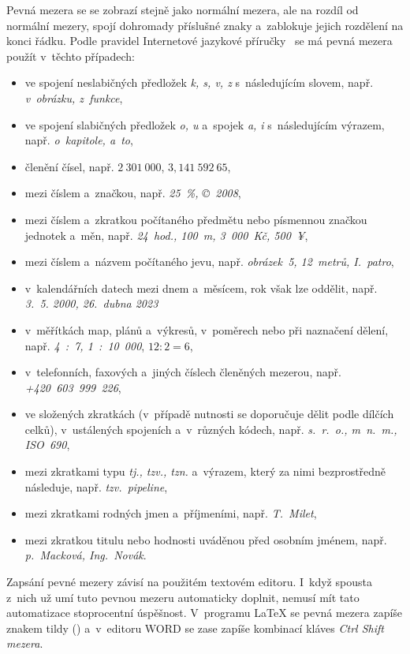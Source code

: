 Pevná mezera se se zobrazí stejně jako normální mezera, ale na rozdíl od normální
mezery, spojí dohromady příslušné znaky a~zablokuje jejich rozdělení na konci
řádku. Podle pravidel Internetové jazykové příručky~\cite{Ustav_pro_jazyk_cesky}
se má pevná mezera použít v~těchto případech:
\begin{itemize}
    \item ve spojení neslabičných předložek \emph{k, s, v, z} s~následujícím
    slovem, např. \emph{v~obrázku, z~funkce},
    \item ve spojení slabičných předložek \emph{o, u} a~spojek \emph{a, i}
    s~následujícím výrazem, např. \emph{o~kapitole, a~to},
    \item členění čísel, např. $\mathit{2~301~000}$, $\mathit{3,141~592~65}$,
    \item mezi číslem a~značkou, např. \emph{25~\%, \copyright~2008},
    \item mezi číslem a~zkratkou počítaného předmětu nebo písmennou značkou
    jednotek a~měn, např. \emph{24~hod., 100~m, 3~000~Kč, 500~¥},
    \item mezi číslem a~názvem počítaného jevu, např. \emph{obrázek~5, 12~metrů,
    I.~patro},
    \item v~kalendářních datech mezi dnem a~měsícem, rok však lze oddělit, např.
    \emph{3.~5. 2000, 26.~dubna 2023}
    \item v~měřítkách map, plánů a~výkresů, v~poměrech nebo při naznačení dělení,
    např. \emph{4~:~7, 1~:~10~000}, $\mathit{12:2=6}$,
    \item v~telefonních, faxových a~jiných číslech členěných mezerou, např. 
    \emph{+420~603~999~226},
    \item ve složených zkratkách (v~případě nutnosti se doporučuje dělit podle
    dílčích celků), v~ustálených spojeních a~v~různých kódech, např.
    \emph{s.~r.~o., m~n.~m., ISO~690},
    \item mezi zkratkami typu \emph{tj., tzv., tzn.} a~výrazem, který za nimi
    bezprostředně následuje, např. \emph{tzv.~pipeline},
    \item mezi zkratkami rodných jmen a~příjmeními, např. \emph{T.~Milet},
    \item mezi zkratkou titulu nebo hodnosti uváděnou před osobním jménem, např.
    \emph{p.~Macková, Ing.~Novák}.
\end{itemize}

Zapsání pevné mezery závisí na použitém textovém editoru. I~když spousta z~nich
už umí tuto pevnou mezeru automaticky doplnit, nemusí mít tato automatizace
stoprocentní úspěšnost. V~programu {\LaTeX} se pevná mezera zapíše znakem tildy
(\texttildelow) a~v~editoru WORD se zase zapíše kombinací kláves
\emph{Ctrl Shift mezera}.


